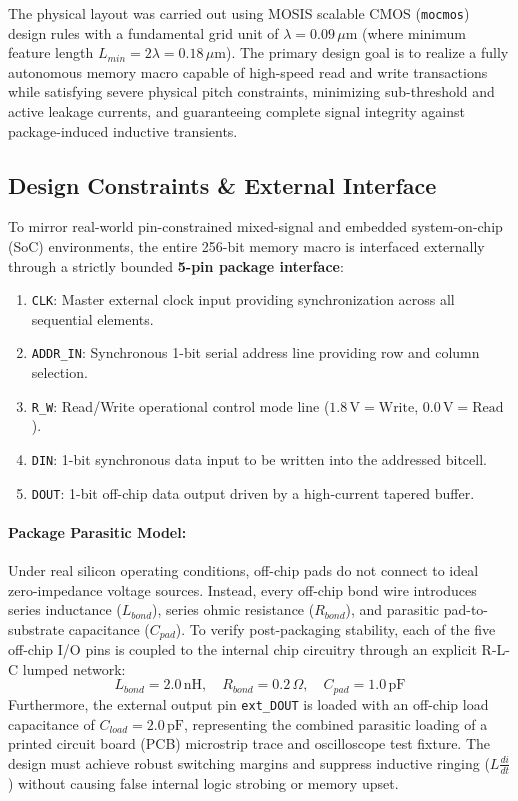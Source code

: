 \documentclass[10pt,a4paper,titlepage]{article}
\begin{document}
The physical layout was carried out using MOSIS scalable CMOS (\texttt{mocmos}) design rules with a fundamental grid unit of $\lambda = 0.09\,\mu\text{m}$ (where minimum feature length $L_{min} = 2\lambda = 0.18\,\mu\text{m}$). The primary design goal is to realize a fully autonomous memory macro capable of high-speed read and write transactions while satisfying severe physical pitch constraints, minimizing sub-threshold and active leakage currents, and guaranteeing complete signal integrity against package-induced inductive transients.

\subsection{Design Constraints \& External Interface}
To mirror real-world pin-constrained mixed-signal and embedded system-on-chip (SoC) environments, the entire 256-bit memory macro is interfaced externally through a strictly bounded \textbf{5-pin package interface}:
\begin{enumerate}[itemsep=2pt,parsep=0pt]
    \item \texttt{CLK}: Master external clock input providing synchronization across all sequential elements.
    \item \texttt{ADDR\_IN}: Synchronous 1-bit serial address line providing row and column selection.
    \item \texttt{R\_W}: Read/Write operational control mode line ($1.8\,\text{V} = \text{Write}$, $0.0\,\text{V} = \text{Read}$).
    \item \texttt{DIN}: 1-bit synchronous data input to be written into the addressed bitcell.
    \item \texttt{DOUT}: 1-bit off-chip data output driven by a high-current tapered buffer.
\end{enumerate}

\paragraph{Package Parasitic Model:} Under real silicon operating conditions, off-chip pads do not connect to ideal zero-impedance voltage sources. Instead, every off-chip bond wire introduces series inductance ($L_{bond}$), series ohmic resistance ($R_{bond}$), and parasitic pad-to-substrate capacitance ($C_{pad}$). To verify post-packaging stability, each of the five off-chip I/O pins is coupled to the internal chip circuitry through an explicit R-L-C lumped network:
\begin{equation}
    L_{bond} = 2.0\,\text{nH}, \quad R_{bond} = 0.2\,\Omega, \quad C_{pad} = 1.0\,\text{pF}
\end{equation}
Furthermore, the external output pin \texttt{ext\_DOUT} is loaded with an off-chip load capacitance of $C_{load} = 2.0\,\text{pF}$, representing the combined parasitic loading of a printed circuit board (PCB) microstrip trace and oscilloscope test fixture. The design must achieve robust switching margins and suppress inductive ringing ($L \frac{di}{dt}$) without causing false internal logic strobing or memory upset.
\end{document}
